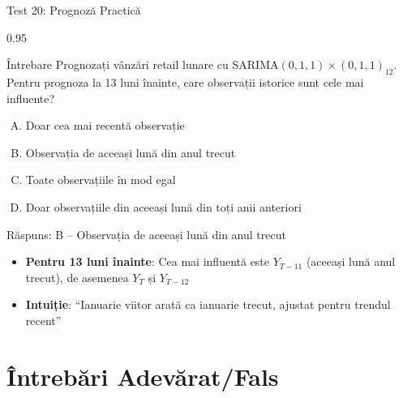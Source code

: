 \documentclass[9pt, aspectratio=169, t]{beamer}
\begin{document}
\begin{frame}{Test 20: Prognoză Practică}
    \begin{cminipage}{0.95\textwidth}
    \begin{alertblock}{Întrebare}
        Prognozați vânzări retail lunare cu SARIMA$(0,1,1) \times (0,1,1)_{12}$. Pentru prognoza la 13 luni înainte, care observații istorice sunt cele mai influente?
    \end{alertblock}

    \vspace{0.3cm}

    \begin{enumerate}[A)]\setlength{\itemsep}{0pt}
        \item Doar cea mai recentă observație
        \item Observația de aceeași lună din anul trecut
        \item Toate observațiile în mod egal
        \item Doar observațiile din aceeași lună din toți anii anteriori
    \end{enumerate}

    \vspace{0.5cm}
    \pause
    \begin{exampleblock}{Răspuns: B -- Observația de aceeași lună din anul trecut}
        {\small
        \begin{itemize}\setlength{\itemsep}{0pt}
        \item \textbf{Pentru 13 luni înainte}: Cea mai influentă este $Y_{T-11}$ (aceeași lună anul trecut), de asemenea $Y_T$ și $Y_{T-12}$
        \item \textbf{Intuiție}: ``Ianuarie viitor arată ca ianuarie trecut, ajustat pentru trendul recent''
        \end{itemize}
        }
    \end{exampleblock}
    \end{cminipage}
\end{frame}

\section{Întrebări Adevărat/Fals}
\end{document}
